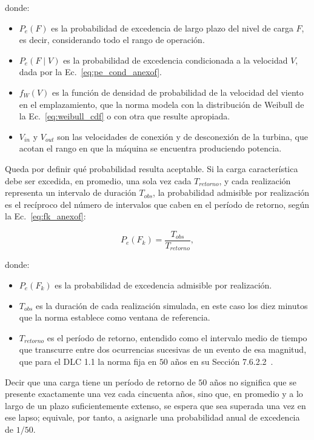 donde:
\begin{itemize}
    \item $P_e(F)$ es la probabilidad de excedencia de largo plazo del nivel de carga $F$, es decir, considerando todo el rango de operación.
    \item $P_e(F \mid V)$ es la probabilidad de excedencia condicionada a la velocidad $V$, dada por la Ec.~\ref{eq:pe_cond_anexof}.
    \item $f_W(V)$ es la función de densidad de probabilidad de la velocidad del viento en el emplazamiento, que la norma modela con la distribución de Weibull de la Ec.~\ref{eq:weibull_cdf} o con otra que resulte apropiada.
    \item $V_{in}$ y $V_{out}$ son las velocidades de conexión y de desconexión de la turbina, que acotan el rango en que la máquina se encuentra produciendo potencia.
\end{itemize}

Queda por definir qué probabilidad resulta aceptable. Si la carga característica debe ser excedida, en promedio, una sola vez cada $T_{retorno}$, y cada realización representa un intervalo de duración $T_{obs}$, la probabilidad admisible por realización es el recíproco del número de intervalos que caben en el período de retorno, según la Ec.~\ref{eq:fk_anexof}:

\begin{equation}
P_e(F_k) = \frac{T_{obs}}{T_{retorno}},
\label{eq:fk_anexof}
\end{equation}

donde:
\begin{itemize}
    \item $P_e(F_k)$ es la probabilidad de excedencia admisible por realización.
    \item $T_{obs}$ es la duración de cada realización simulada, en este caso los diez minutos que la norma establece como ventana de referencia.
    \item $T_{retorno}$ es el período de retorno, entendido como el intervalo medio de tiempo que transcurre entre dos ocurrencias sucesivas de un evento de esa magnitud, que para el DLC 1.1 la norma fija en $50$ años en su Sección 7.6.2.2~\parencite{IEC61400-1}.
\end{itemize}

Decir que una carga tiene un período de retorno de $50$ años no significa que se presente exactamente una vez cada cincuenta años, sino que, en promedio y a lo largo de un plazo suficientemente extenso, se espera que sea superada una vez en ese lapso; equivale, por tanto, a asignarle una probabilidad anual de excedencia de $1/50$.

